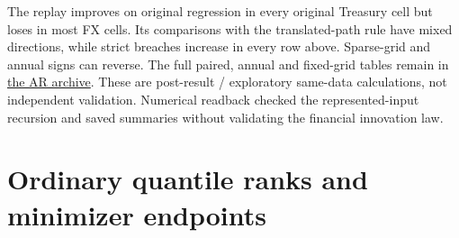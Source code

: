 \documentclass[11pt,a4paper]{article}
\begin{document}
The replay improves on original regression in every original Treasury
cell but loses in most FX cells. Its comparisons with the translated-path rule
have mixed directions, while strict breaches increase in every row above.
Sparse-grid and annual signs can reverse. The full paired, annual and fixed-grid
tables remain in \href{https://github.com/ByronLi0207/financial-mathematics-paper-20261020/blob/revision-v7-final/results/revision-20261022/ar1-replay/README.md}{the AR archive}.
These are post-result / exploratory same-data calculations, not independent
validation. Numerical readback checked the represented-input recursion and
saved summaries without validating the financial innovation law.\section{Ordinary quantile ranks and minimizer endpoints}\label{sup:rank}
\end{document}

